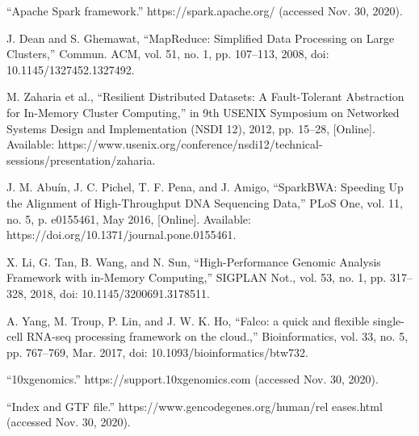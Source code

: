 \documentclass[10pt,journal,compsoc]{IEEEtran}
\begin{document}
\begin{thebibliography}{1}
“Apache Spark framework.” https://spark.apache.org/ (accessed Nov. 30, 2020).

J. Dean and S. Ghemawat, “MapReduce: Simplified Data Processing on Large Clusters,” Commun. ACM, vol. 51, no. 1, pp. 107–113, 2008, doi: 10.1145/1327452.1327492.

M. Zaharia et al., “Resilient Distributed Datasets: A Fault-Tolerant Abstraction for In-Memory Cluster Computing,” in 9th {USENIX} Symposium on Networked Systems Design and Implementation ({NSDI} 12), 2012, pp. 15–28, [Online]. Available: https://www.usenix.org/conference/nsdi12/technical-sessions/presentation/zaharia.

J. M. Abuín, J. C. Pichel, T. F. Pena, and J. Amigo, “SparkBWA: Speeding Up the Alignment of High-Throughput DNA Sequencing Data,” PLoS One, vol. 11, no. 5, p. e0155461, May 2016, [Online]. Available: https://doi.org/10.1371/journal.pone.0155461.

X. Li, G. Tan, B. Wang, and N. Sun, “High-Performance Genomic Analysis Framework with in-Memory Computing,” SIGPLAN Not., vol. 53, no. 1, pp. 317–328, 2018, doi: 10.1145/3200691.3178511.

A. Yang, M. Troup, P. Lin, and J. W. K. Ho, “Falco: a quick and flexible single-cell RNA-seq processing framework on the cloud.,” Bioinformatics, vol. 33, no. 5, pp. 767–769, Mar. 2017, doi: 10.1093/bioinformatics/btw732.

“10xgenomics.” https://support.10xgenomics.com (accessed Nov. 30, 2020).

“Index and GTF file.” https://www.gencodegenes.org/human/rel eases.html (accessed Nov. 30, 2020).

\end{thebibliography}

% 
\end{document}
